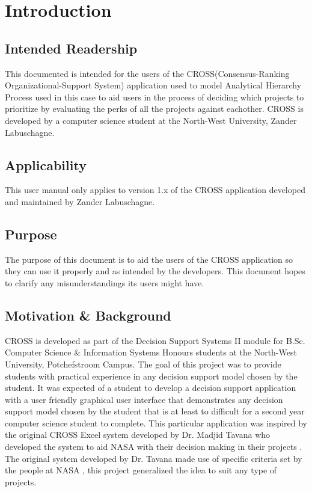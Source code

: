 \documentclass[11pt]{article}
\begin{document}
	

    \renewcommand{\cftsecleader}{\cftdotfill{\cftdotsep}} %
    \tableofcontents
    \thispagestyle{empty}
    \clearpage


    \setcounter{page}{1}

	\section{Introduction}
		\subsection{Intended Readership}
			This documented is intended for the users of the CROSS(Consensus-Ranking Organizational-Support System) application used to model Analytical Hierarchy Process used in this case to aid users in the process of deciding which projects to prioritize by evaluating the perks of all the projects against eachother. CROSS is developed by a computer science student at the North-West University, Zander Labuschagne.

		\subsection{Applicability}
			This user manual only applies to version 1.x of the CROSS application developed and maintained by Zander Labuschagne.

		\subsection{Purpose}
			The purpose of this document is to aid the users of the CROSS application so they can use it properly and as intended by the developers. This document hopes to clarify any misunderstandings its users might have.

		\subsection{Motivation \& Background}
			CROSS is developed as part of the Decision Support Systems II module for B.Sc. Computer Science \& Information Systems Honours students at the North-West University, Potchefstroom Campus. The goal of this project was to provide students with practical experience in any decision support model chosen by the student. It was expected of a student to develop a decision support application with a user friendly graphical user interface that demonstrates any decision support model chosen by the student that is at least to difficult for a second year computer science student to complete. This particular application was inspired by the original CROSS Excel system developed by Dr. Madjid Tavana who developed the system to aid NASA with their decision making in their projects \cite{tavana1996cross}. The original system developed by Dr. Tavana made use of specific criteria set by the people at NASA \cite{tavana2003cross}, this project generalized the idea to suit any type of projects.
	
\end{document}
